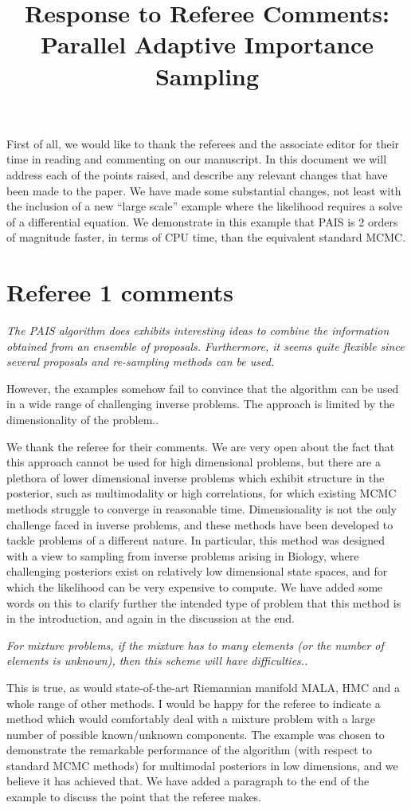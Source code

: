\documentclass{article}
\newcommand{\comment}[2]{\vspace{0.6cm}{\bf Comment:} {\it #1.}

\vspace{0.3cm}{\bf Answer:} #2}
\begin{document}
\title{Response to Referee Comments: Parallel Adaptive Importance Sampling}
\maketitle
First of all, we would like to thank the referees and the associate editor for
their time in reading and commenting on our manuscript. In this document
we will address each of the points raised, and describe any relevant
changes that have been made to the paper. We have made some substantial changes, not least with the inclusion of a new ``large scale'' example where the likelihood requires a solve of a differential equation. We demonstrate in this example that PAIS is 2 orders of magnitude faster, in terms of CPU time, than the equivalent standard MCMC.

\section*{Referee 1 comments}

\comment{The PAIS algorithm does exhibits interesting ideas to combine the information 
obtained from an ensemble of proposals. Furthermore, it seems quite flexible 
since several proposals and re-sampling methods can be used.

However, the examples somehow fail to convince that the algorithm can be used 
in a wide range of challenging inverse problems. The approach is limited by the 
dimensionality of the problem.}{We thank the referee for their comments. We are very open about the fact that this approach cannot be used for high dimensional problems, but there are a plethora of lower dimensional inverse problems which exhibit structure in the posterior, such as multimodality or high correlations, for which existing MCMC methods struggle to converge in reasonable time. Dimensionality is not the only challenge faced in inverse problems, and these methods have been developed to tackle problems of a different nature. In particular, this method was designed with a view to sampling from inverse problems arising in Biology, where challenging posteriors exist on relatively low dimensional state spaces, and for which the likelihood can be very expensive to compute. We have added some words on this to clarify further the intended type of problem that this method is in the introduction, and again in the discussion at the end.}  %

\comment{For mixture problems, if the mixture has to many 
elements (or the number of elements is unknown), then this scheme will have 
difficulties.}{This is true, as would state-of-the-art Riemannian manifold MALA, HMC and a whole range of other methods. I would be happy for the referee to indicate a method which would comfortably deal with a mixture problem with a large number of possible known/unknown components. The example was chosen to demonstrate the remarkable performance of the algorithm (with respect to standard MCMC methods) for multimodal posteriors in low dimensions, and we believe it has achieved that. We have added a paragraph to the end of the example to discuss the point that the referee makes.}%
\end{document}
